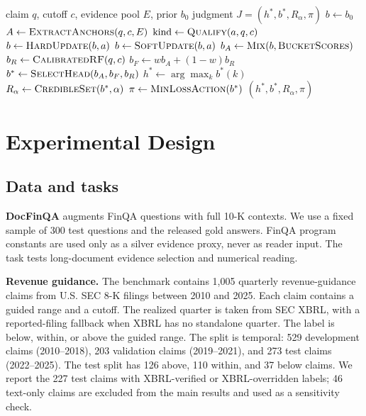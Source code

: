 \documentclass[11pt]{article}
\newcommand{\anchor}{\textsc{AnchorEvolve}}
\begin{document}
\begin{algorithm}[t]
\caption{\anchor{} single-round adjudication}
\label{alg:anchor}
\begin{algorithmic}[1]
\Require claim $q$, cutoff $c$, evidence pool $E$, prior $b_0$
\Ensure judgment $J=(h^*,b^*,R_\alpha,\pi)$
\State $b\gets b_0$
\State $A\gets \textsc{ExtractAnchors}(q,c,E)$
  \State $\text{kind}\gets \textsc{Qualify}(a,q,c)$
    \State $b\gets \textsc{HardUpdate}(b,a)$
    \State $b\gets \textsc{SoftUpdate}(b,a)$
  \EndIf
\EndFor
\State $b_A\gets \textsc{Mix}(b,\textsc{BucketScores})$
\State $b_R\gets \textsc{CalibratedRF}(q,c)$
\State $b_F\gets w b_A+(1-w)b_R$
\State $b^*\gets \textsc{SelectHead}(b_A,b_F,b_R)$
\State $h^*\gets \arg\max_k b^*(k)$
\State $R_\alpha\gets \textsc{CredibleSet}(b^*,\alpha)$
\State $\pi\gets \textsc{MinLossAction}(b^*)$
\State \Return $(h^*,b^*,R_\alpha,\pi)$
\end{algorithmic}
\end{algorithm}

\section{Experimental Design}
\label{sec:experiments}

\subsection{Data and tasks}
\textbf{DocFinQA} \citep{reddy2024docfinqa} augments FinQA questions with full 10-K contexts. We use a fixed sample of 300 test questions and the released gold answers. FinQA program constants are used only as a silver evidence proxy, never as reader input. The task tests long-document evidence selection and numerical reading.

\textbf{Revenue guidance.} The benchmark contains 1,005 quarterly revenue-guidance claims from U.S. SEC 8-K filings between 2010 and 2025. Each claim contains a guided range and a cutoff. The realized quarter is taken from SEC XBRL, with a reported-filing fallback when XBRL has no standalone quarter. The label is below, within, or above the guided range. The split is temporal: 529 development claims (2010--2018), 203 validation claims (2019--2021), and 273 test claims (2022--2025). The test split has 126 above, 110 within, and 37 below claims. We report the 227 test claims with XBRL-verified or XBRL-overridden labels; 46 text-only claims are excluded from the main results and used as a sensitivity check.
\end{document}
